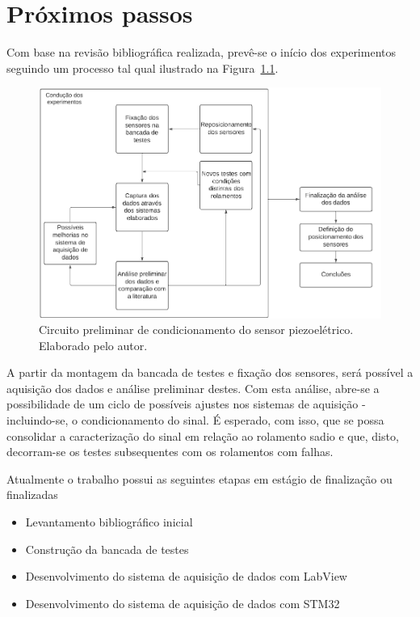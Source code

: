 \documentclass[
	12pt,				
	oneside,			
	a4paper,			
	english,			
	brazil,			
	]{abntex2ppgsi}
\begin{document}
\chapter{Próximos passos}

Com base na revisão bibliográfica realizada, prevê-se o início dos experimentos seguindo um processo tal qual ilustrado na Figura~\ref{fluxograma_testes}.

\begin{figure}[H]
\centering
\includegraphics[width=\textwidth,height=\textheight,keepaspectratio]{fluxograma_testes}
\caption {Circuito preliminar de condicionamento do sensor piezoelétrico. Elaborado pelo autor.}
\label{fluxograma_testes}
\end{figure} 

A partir da montagem da bancada de testes e fixação dos sensores, será possível a aquisição dos dados e análise preliminar destes. Com esta análise, abre-se a possibilidade de um ciclo de possíveis ajustes nos sistemas de aquisição - incluindo-se, o condicionamento do sinal. É esperado, com isso, que se possa consolidar a caracterização do sinal em relação ao rolamento sadio e que, disto, decorram-se os testes subsequentes com os rolamentos com falhas.

Atualmente o trabalho possui as seguintes etapas em estágio de finalização ou finalizadas

\begin{itemize}
	\item Levantamento bibliográfico inicial
	\item Construção da bancada de testes
	\item Desenvolvimento do sistema de aquisição de dados com LabView
	\item Desenvolvimento do sistema de aquisição de dados com STM32
\end{itemize}
\end{document}

